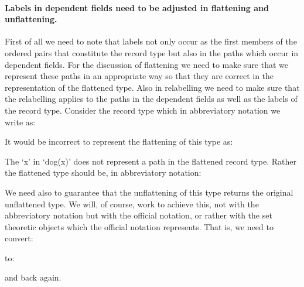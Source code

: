 \paragraph{Labels in dependent fields need to be adjusted in
  flattening and unflattening.} First of all we need to
note that labels not only occur as the first members of the ordered
pairs that constitute the record type but also in the paths which
occur in dependent fields.  For the discussion of flattening we need
to make sure that we represent these paths in an appropriate way so
that they are correct in the representation of the flattened type.
Also in relabelling we need to make sure that the relabelling applies
to the paths in the dependent fields as well as the labels of the
record type.  Consider the record type which in abbreviatory notation
we write as:
\begin{quote}
\end{quote}
It would be incorrect to represent the flattening of this type as:
\begin{quote}
\end{quote}
The `x' in `dog(x)' does not represent a path in the flattened record
type. Rather the flattened type should be, in abbreviatory notation:
\begin{quote}
\end{quote}
We need also to guarantee that the unflattening of this type returns
the original unflattened type.  We will, of course, work to achieve
this, not with the abbreviatory notation but with the official
notation, or rather with the set theoretic objects which the official
notation represents.  That is, we need to convert: 
\begin{quote}
\end{quote}
to:
\begin{quote}
\end{quote}
and back again.



